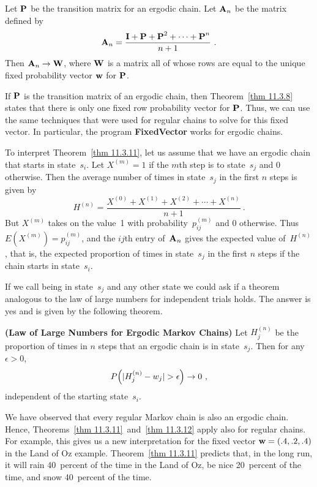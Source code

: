 \begin{theorem}\label{thm 11.3.11}
Let ${\mbox{\bf P}\/}$ be the transition matrix for an ergodic chain.  Let ${\mbox{\bf A}\/}_n$
be the
matrix defined by
$$
{\mbox{\bf A}\/}_n = \frac{{\mbox{\bf I}\/} + {\mbox{\bf P}\/} + {\mbox{\bf P}\/}^2 +\cdots + {\mbox{\bf P}\/}^n}{n +
1}\ .
$$
Then ${\mbox{\bf A}\/}_n \to {\mbox{\bf W}\/}$, where ${\mbox{\bf W}\/}$ is a matrix all of whose rows
are equal 
to the unique fixed probability vector ${\mbox{\bf w}\/}$ for ${\mbox{\bf P}\/}$.  
\end{theorem}

\par
If ${\mbox{\bf P}\/}$ is the transition matrix of an ergodic chain, then
Theorem~\ref{thm 11.3.8} states
that there is only one fixed row probability vector for ${\mbox{\bf P}\/}$.  Thus, we
can use the same
techniques that were used for regular chains to solve for this fixed vector. 
In particular,
the program {\bf FixedVector} works for ergodic chains.
\par
To interpret Theorem~\ref{thm 11.3.11}, let us assume that we have an ergodic
chain that
starts in state~$s_i$.  Let $X^{(m)} = 1$ if the $m$th step is to state~$s_j$
and 0
otherwise.  Then the average number of times in state~$s_j$ in the first $n$
steps is given by
$$
H^{(n)} = \frac{X^{(0)} + X^{(1)} + X^{(2)} +\cdots+ X^{(n)}}{n + 1}\ .
$$
But $X^{(m)}$ takes on the value~1 with probability~$p_{ij}^{(m)}$ and 0
otherwise.  Thus $E(X^{(m)}) = p_{ij}^{(m)}$, and the $ij$th entry of~${\mbox{\bf A}\/}_n$
gives the expected value of~$H^{(n)}$, that is, the expected proportion of
times in state~$s_j$ in the first $n$ steps if the chain starts in state~$s_i$.

If we call being in state~$s_j$  and any other state
 we could ask
if a theorem analogous to the law of large numbers for independent trials
holds.  
The answer is yes and is given by the following theorem.

\begin{theorem}{\bf (Law of Large Numbers for Ergodic Markov Chains)}\label{thm
11.3.12}
Let $H_j^{(n)}$ be the proportion of times in $n$ steps that an ergodic chain
is in state~$s_j$.  Then for any $\epsilon > 0$,
$$
P\Bigl(|H_j^{(n)} - w_j| > \epsilon\Bigr) \to 0\ ,
$$
independent of the starting state~$s_i$.
\end{theorem}

We have observed that every regular Markov chain is also an ergodic chain. 
Hence, Theorems~\ref{thm 11.3.11}~and~\ref{thm 11.3.12} apply also for regular
chains.  For example, this gives us a new interpretation for the fixed vector
${\mbox{\bf w}\/} = (.4,.2,.4)$ in the Land of Oz example.  Theorem~\ref{thm 11.3.11} 
predicts that, in the long run, it will rain 40~percent of the time in the Land
of
Oz, be nice 20~percent of the time, and snow 40~percent of the time.

